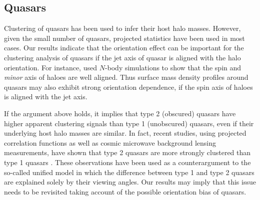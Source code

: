 \documentclass[a4paper,fleqn,usenatbib]{mnras}
\begin{document}
\subsection{Quasars}
Clustering of quasars has been used to infer their host halo
masses. However, given the small number of quasars, projected
statistics have been used in most cases. Our results indicate that the
orientation effect can be important for the clustering analysis of
quasars if the jet axis of quasar is aligned with the halo
orientation. For instance, \citet{Zhang2009} used $N$-body simulations
to show that the spin and {\it minor} axis of haloes are well
aligned. Thus surface mass density profiles around quasars may also
exhibit strong orientation dependence, if the spin axis of haloes is
aligned with the jet axis.

If the argument above holds, it implies that type 2 (obscured) quasars
have higher apparent clustering signals than type 1 (unobscured)
quasars, even if their underlying host halo masses are similar. In fact,
recent studies, using projected correlation functions as well as
cosmic microwave background lensing measurements, have shown that
type 2 quasars are more strongly clustered than type 1 quasars
\citep[e.g.,][]{Hickox2011,Donoso2014,DiPompeo2016}. These
observations have been used as a counterargument to the so-called
unified model in which the difference between type 1 and type 2
quasars are explained solely by their viewing angles. Our results may
imply that this issue needs to be revisited taking account of the
possible orientation bias of quasars.
\end{document}
